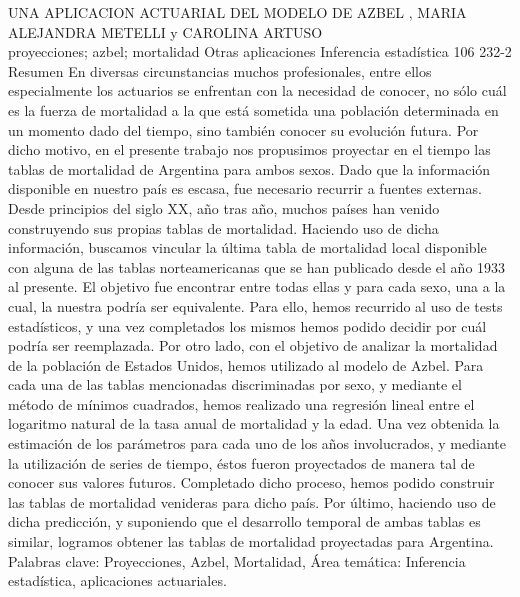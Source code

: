 \A
{UNA APLICACION ACTUARIAL DEL MODELO DE AZBEL}
{, MARIA ALEJANDRA METELLI y CAROLINA ARTUSO}
{
\\}
{proyecciones; azbel; mortalidad} 
 {Otras aplicaciones} 
 {Inferencia estadística} 
 {106} 
 {232-2}
{Resumen En diversas circunstancias muchos profesionales, entre ellos especialmente los actuarios se enfrentan con la necesidad de conocer, no sólo cuál es la fuerza de mortalidad a la que está sometida una población determinada en un momento dado del tiempo, sino también conocer su evolución futura. Por dicho motivo, en el presente trabajo nos propusimos proyectar en el tiempo las tablas de mortalidad de Argentina para ambos sexos. Dado que la información disponible en nuestro país es escasa, fue necesario recurrir a fuentes externas. Desde principios del siglo XX, año tras año, muchos países han venido construyendo sus propias tablas de mortalidad. Haciendo uso de dicha información, buscamos vincular la última tabla de mortalidad local disponible con alguna de las tablas norteamericanas que se han publicado desde el año 1933 al presente. El objetivo fue encontrar entre todas ellas y para cada sexo, una a la cual, la nuestra podría ser equivalente. Para ello, hemos recurrido al uso de tests estadísticos, y una vez completados los mismos hemos podido decidir por cuál podría ser reemplazada. Por otro lado, con el objetivo de analizar la mortalidad de la población de Estados Unidos, hemos utilizado al modelo de Azbel. Para cada una de las tablas mencionadas discriminadas por sexo, y mediante el método de mínimos cuadrados, hemos realizado una regresión lineal entre el logaritmo natural de la tasa anual de mortalidad y la edad. Una vez obtenida la estimación de los parámetros para cada uno de los años involucrados, y mediante la utilización de series de tiempo, éstos fueron proyectados de manera tal de conocer sus valores futuros. Completado dicho proceso, hemos podido construir las tablas de mortalidad venideras para dicho país. Por último, haciendo uso de dicha predicción, y suponiendo que el desarrollo temporal de ambas tablas es similar, logramos obtener las tablas de mortalidad proyectadas para Argentina. Palabras clave: Proyecciones, Azbel, Mortalidad, Área temática: Inferencia estadística, aplicaciones actuariales. }
